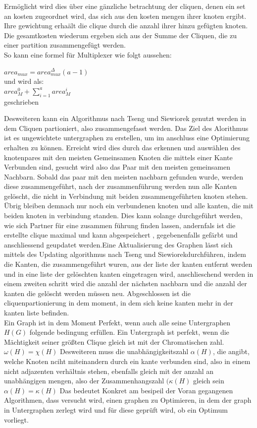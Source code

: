 \documentclass[conference]{IEEEtran}
\begin{document}
Ermöglicht wird dies über eine gänzliche betrachtung der cliquen, denen ein set an kosten zugeordnet wird, das sich aus den kosten mengen ihrer knoten ergibt. Ihre gewichtung erhaält die clique durch die anzahl ihrer hinzu gefügten knoten. Die gesamtkosten wiederum ergeben sich aus der Summe der Cliquen, die zu einer partition zusammengefügt werden.\cite[S. 247]{3}\\
So kann eine formel für Multiplexer wie folgt aussehen:\\
\begin{center}
$area_{mux} = area_{mux}^{\Delta}(a-1)  $ \\und wird als:\\ $area_{M}^{0} + \sum_{i=1}^{a}area_{M}^{i}$\\ geschrieben\\  \cite[S. 247]{3}
\end{center}

Desweiteren kann ein Algorithmus nach Tseng und Siewiorek genutzt werden in dem Cliquen partioniert, also zusammengefasst werden. Das Ziel des Alorithmus ist es ungewichtete untergraphen zu erstellen, um im anschluss eine Optimierung erhalten zu können\cite[S. 247]{3}.
Erreicht wird dies durch das erkennen und auswählen des knotenpares mit den meisten Gemeinsamen Knoten die mittels einer Kante Verbunden sind, gesucht wird also das Paar mit den meisten gemeinsamen Nachbarn. Sobald das paar mit den meisten nachbarn gefunden wurde, werden diese zusammengeführt, nach der zusammenführung werden nun alle Kanten gelöscht, die nicht in Verbindung mit beiden zusammengeführten knoten stehen. Übrig bleiben demnach nur noch ein verbundenen knoten und alle kanten, die mit beiden knoten in verbindung standen. Dies kann solange durchgeführt werden, wie sich Partner für eine zusammen führung finden lassen, andernfals ist die erstellte clique maximal und kann abgespeichert , gegebenenfalls gefärbt und anschliessend geupdatet werden.Eine Aktualisierung des Graphen lässt sich mittels des Updating algorithmus nach Tseng und Siewiorek\cite[S.393]{5}durchführen, indem die Kanten, die zusammengeführt wuren, aus der liste der kanten entfernt werden und in eine liste der gelöschten kanten eingetragen wird, anschlieschend werden in einem zweiten schritt wird die anzahl der nächsten nachbarn und die anzahl der kanten die gelöscht werden müssen neu. 
 Abgeschlossen ist die cliquenpartionierung in dem moment, in dem sich keine kanten mehr in der kanten liste befinden\cite[S.248]{3}\cite[S.392-393]{5}.\\
Ein Graph ist in dem Moment Perfekt, wenn auch alle seine Untergraphen $H(G)$ folgende bedingung erfüllen. Ein Untergraph ist perfekt, wenn die Mächtigkeit seiner größten Clique gleich ist mit der Chromatischen zahl. $\omega(H) = \chi(H)$ Desweiteren muss die unabhängigkeitszahl $ \alpha(H)$, die angibt, welche Knoten nciht miteinandern durch ein kante verbunden sind, also in einem nicht adjazenten verhältnis stehen, ebenfalls gleich mit der anzahl an unabhängigen mengen, also der Zusammenhangszahl $(\kappa(H)$ gleich sein $\alpha(H) = \kappa(H)$\cite[S.507]{1}\cite[S.59 - 60 ]{6} Das bedeutet Konkret am besipeil der Voran gegangenen Algorithmen, dass versucht wird, einen graphen zu Optimieren, in dem der graph in Untergraphen zerlegt wird und für diese geprüft wird, ob ein Optimum vorliegt.
\end{document}
